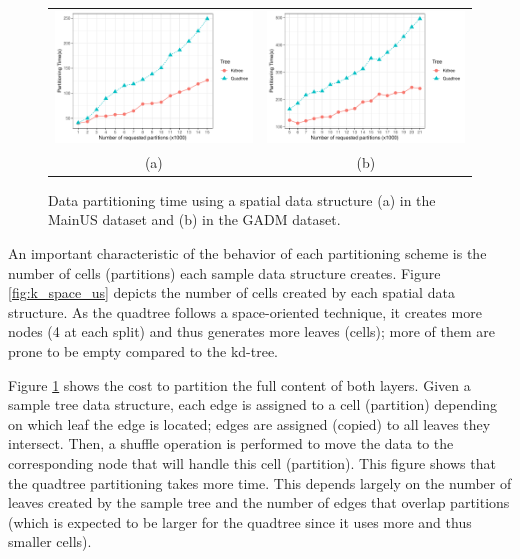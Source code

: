  \begin{figure}
     \centering
     \begin{tabular}{cc}
         \includegraphics[width=0.49\linewidth]{chapterSDCEL/K_Partitioning_US.pdf} &
         \includegraphics[width=0.49\linewidth]{chapterSDCEL/K_Partitioning_GADM.pdf} \\
         (a) & (b)
     \end{tabular}
     \caption{Data partitioning time using a spatial data structure (a) in the MainUS dataset and (b) in the GADM dataset.} \label{fig:k_partitioning_us}
 \end{figure}

An important characteristic of the behavior of each partitioning scheme is the number of cells (partitions) each sample data structure creates. Figure \ref{fig:k_space_us} depicts the number of cells created by each spatial data structure. As the quadtree follows a space-oriented technique, it creates more nodes (4 at each split) and thus generates more leaves (cells); more of them are prone to be empty compared to the kd-tree.

Figure \ref{fig:k_partitioning_us} shows the cost to partition the full content of both layers. Given a sample tree data structure, each edge is assigned to a cell (partition) depending on which leaf the edge is located; edges are assigned (copied) to all leaves they intersect. Then, a shuffle operation is performed to move the data to the corresponding node that will handle this cell (partition). This figure shows that the quadtree partitioning takes more time. This depends largely on the number of leaves created by the sample tree and the number of edges that overlap partitions (which is expected to be larger for the quadtree since it uses more and thus smaller cells).

